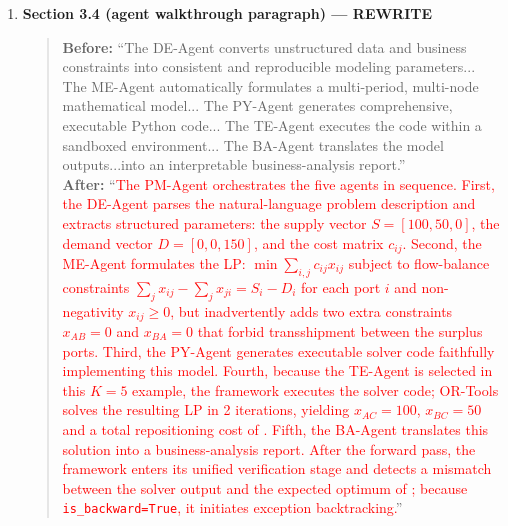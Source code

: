 \documentclass[11pt,a4paper]{article}
\begin{document}
\begin{enumerate}
\item \textbf{Section 3.4 (agent walkthrough paragraph) --- REWRITE}
\begin{quote}
\textbf{Before:} ``The DE-Agent converts unstructured data and business constraints into consistent and reproducible modeling parameters... The ME-Agent automatically formulates a multi-period, multi-node mathematical model... The PY-Agent generates comprehensive, executable Python code... The TE-Agent executes the code within a sandboxed environment... The BA-Agent translates the model outputs...into an interpretable business-analysis report.''\\[4pt]
\textbf{After:} ``\textcolor{red}{The PM-Agent orchestrates the five agents in sequence. First, the DE-Agent parses the natural-language problem description and extracts structured parameters: the supply vector $S{=}[100,50,0]$, the demand vector $D{=}[0,0,150]$, and the cost matrix $c_{ij}$. Second, the ME-Agent formulates the LP: $\min \sum_{i,j}c_{ij}x_{ij}$ subject to flow-balance constraints $\sum_j x_{ij}-\sum_j x_{ji}=S_i-D_i$ for each port $i$ and non-negativity $x_{ij}\geq 0$, but inadvertently adds two extra constraints $x_{AB}{=}0$ and $x_{BA}{=}0$ that forbid transshipment between the surplus ports. Third, the PY-Agent generates executable solver code faithfully implementing this model. Fourth, because the TE-Agent is selected in this $K{=}5$ example, the framework executes the solver code; OR-Tools solves the resulting LP in 2 iterations, yielding $x_{AC}{=}100$, $x_{BC}{=}50$ and a total repositioning cost of . Fifth, the BA-Agent translates this solution into a business-analysis report. After the forward pass, the framework enters its unified verification stage and detects a mismatch between the solver output and the expected optimum of ; because \texttt{is\_backward=True}, it initiates exception backtracking.}''
\end{quote}


\end{enumerate}
\end{document}
